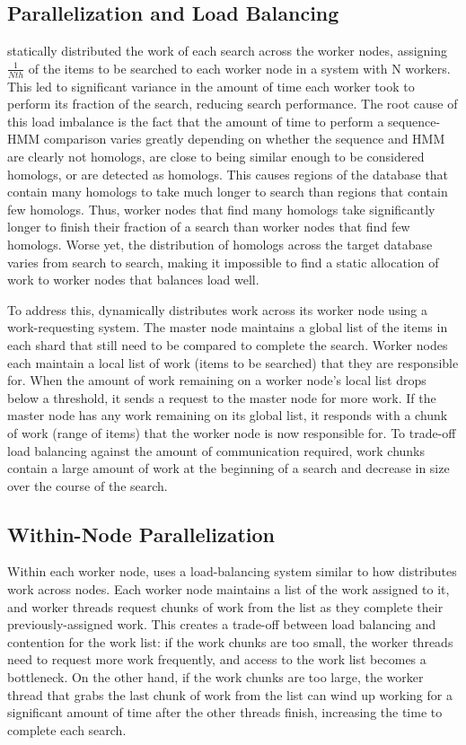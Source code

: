 \documentclass[notoc,justified,openany]{tufte-book}    %
\newcommand{\hmmserver}{\mono{hmmserver}\xspace}
\newcommand{\hmmpgmd}{\mono{hmmpgmd}\xspace}
\newcommand{\Hmmpgmd}{\mono{Hmmpgmd}\xspace}
\begin{document}
\begin{itemize}
\section{Parallelization and Load Balancing}
\Hmmpgmd statically distributed the work of each search across the worker nodes, assigning $\frac{1}{Nth}$ of the items to be searched to each worker node in a system with N workers.  This led to significant variance in the amount of time each worker took to perform its fraction of the search, reducing search performance. The root cause of this load imbalance is the fact that the amount of time to perform a sequence-HMM comparison varies greatly depending on whether the sequence and HMM are clearly not homologs, are close to being similar enough to be considered homologs, or are detected as homologs.  This causes regions of the database that contain many homologs to take much longer to search than regions that contain few homologs.  Thus, worker nodes that find many homologs take significantly longer to finish their fraction of a search than worker nodes that find few homologs.  Worse yet, the distribution of homologs across the target database varies from search to search, making it impossible to find a static allocation of work to worker nodes that balances load well.

To address this, \hmmserver dynamically distributes work across its worker node using a work-requesting system.  The master node maintains a global list of the items in each shard that still need to be compared to complete the search.  Worker nodes each maintain a local list of work (items to be searched) that they are responsible for.  When the amount of work remaining on a worker node's local list drops below a threshold, it sends a request to the master node for more work.  If the master node has any work remaining on its global list, it responds with a chunk of work (range of items) that the worker node is now responsible for.  To trade-off load balancing against the amount of communication required, work chunks contain a large amount of work at the beginning of a search and decrease in size over the course of the search.

\subsection{Within-Node Parallelization}
Within each worker node, \hmmpgmd uses a load-balancing system similar to how \hmmserver distributes work across nodes.  Each worker node maintains a list of the work assigned to it, and worker threads request chunks of work from the list as they complete their previously-assigned work.  This creates a trade-off between load balancing and contention for the work list: if the work chunks are too small, the worker threads need to request more work frequently, and access to the work list becomes a bottleneck.  On the other hand, if the work chunks are too large, the worker thread that grabs the last chunk of work from the list can wind up working for a significant amount of time after the other threads finish, increasing the time to complete each search.


\end{itemize}
\end{document}
